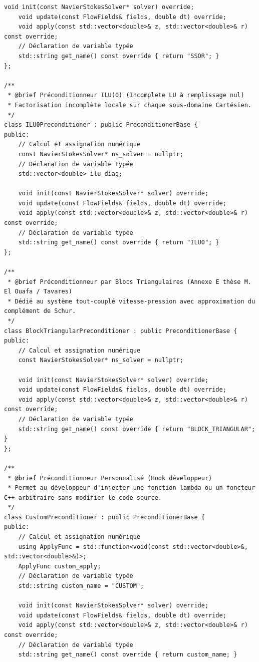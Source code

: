 \documentclass[10pt,a4paper,oneside]{book}
\begin{document}
\begin{lstlisting}[language={[11]C++}]
    void init(const NavierStokesSolver* solver) override;
    void update(const FlowFields& fields, double dt) override;
    void apply(const std::vector<double>& z, std::vector<double>& r) const override;
    // Déclaration de variable typée
    std::string get_name() const override { return "SSOR"; }
};

/**
 * @brief Préconditionneur ILU(0) (Incomplete LU à remplissage nul)
 * Factorisation incomplète locale sur chaque sous-domaine Cartésien.
 */
class ILU0Preconditioner : public PreconditionerBase {
public:
    // Calcul et assignation numérique
    const NavierStokesSolver* ns_solver = nullptr;
    // Déclaration de variable typée
    std::vector<double> ilu_diag;

    void init(const NavierStokesSolver* solver) override;
    void update(const FlowFields& fields, double dt) override;
    void apply(const std::vector<double>& z, std::vector<double>& r) const override;
    // Déclaration de variable typée
    std::string get_name() const override { return "ILU0"; }
};

/**
 * @brief Préconditionneur par Blocs Triangulaires (Annexe E thèse M. El Ouafa / Tavares)
 * Dédié au système tout-couplé vitesse-pression avec approximation du complément de Schur.
 */
class BlockTriangularPreconditioner : public PreconditionerBase {
public:
    // Calcul et assignation numérique
    const NavierStokesSolver* ns_solver = nullptr;

    void init(const NavierStokesSolver* solver) override;
    void update(const FlowFields& fields, double dt) override;
    void apply(const std::vector<double>& z, std::vector<double>& r) const override;
    // Déclaration de variable typée
    std::string get_name() const override { return "BLOCK_TRIANGULAR"; }
};

/**
 * @brief Préconditionneur Personnalisé (Hook développeur)
 * Permet au développeur d'injecter une fonction lambda ou un foncteur C++ arbitraire sans modifier le code source.
 */
class CustomPreconditioner : public PreconditionerBase {
public:
    // Calcul et assignation numérique
    using ApplyFunc = std::function<void(const std::vector<double>&, std::vector<double>&)>;
    ApplyFunc custom_apply;
    // Déclaration de variable typée
    std::string custom_name = "CUSTOM";

    void init(const NavierStokesSolver* solver) override;
    void update(const FlowFields& fields, double dt) override;
    void apply(const std::vector<double>& z, std::vector<double>& r) const override;
    // Déclaration de variable typée
    std::string get_name() const override { return custom_name; }


\end{lstlisting}
\end{document}
